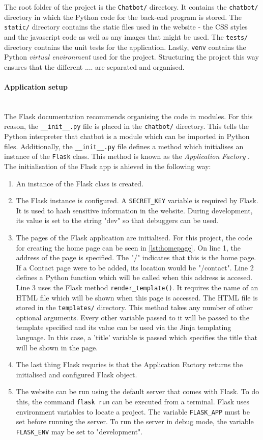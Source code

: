 \documentclass[12pt,a4paper]{article}
\newcommand{\myparagraph}[1]{\paragraph{#1}\mbox{}\\}
\begin{document}
The root folder of the project is the \texttt{Chatbot/} directory. It contains the \texttt{chatbot/} directory in which the Python code for the back-end program is stored. The \texttt{static/} directory contains the static files used in the website - the CSS styles and the javascript code as well as any images that might be used. The \texttt{tests/} directory contains the unit tests for the application. Lastly, \texttt{venv} contains the Python \textit{virtual environment} used for the project. Structuring the project this way ensures that the different .... are separated and organised.

\myparagraph{Application setup}
The Flask documentation recommends organising the code in modules. For this reason, the \texttt{\_\_init\_\_.py} file is placed in the \texttt{chatbot/} directory. This tells the Python interpreter that chatbot is a module which can be imported in Python files. Additionally, the \texttt{\_\_init\_\_.py} file defines a method which initialises an instance of the \texttt{Flask} class. This method is known as the \textit{Application Factory} \cite{Flask:online}. The initialisation of the Flask app is ahieved in the following way:

\begin{enumerate}
    \item An instance of the Flask class is created.
    \item The Flask instance is configured. A \texttt{SECRET\_KEY} variable is required by Flask. It is used to hash sensitive information in the website. During development, its value is set to the string "dev" so that debuggers can be used.
    \item The pages of the Flask application are initialised. For this project, the code for creating the home page can be seen in \cref{lst:homepage}. On line 1, the address of the page is specified. The "/" indicates that this is the home page. If a Contact page were to be added, its location would be "/contact". Line 2 defines a Python function which will be called when this address is accesed. Line 3 uses the Flask method \texttt{render\_template()}. It requires the name of an HTML file which will be shown when this page is accessed. The HTML file is stored in the \texttt{templates/} directory. This method takes any number of other optional arguments. Every other variable passed to it will be passed to the template specified and its value can be used via the Jinja templating language. In this case, a 'title' variable is passed which specifies the title that will be shown in the page.
    \item The last thing Flask requries is that the Application Factory returns the initialised and configured Flask object.
    \item The website can be run using the default server that comes with Flask. To do this, the command \texttt{flask run} can be executed from a terminal. Flask uses environment variables to locate a project. The variable \texttt{FLASK\_APP} must be set before running the server. To run the server in debug mode, the variable \texttt{FLASK\_ENV} may be set to "development". 
\end{enumerate}
\end{document}
